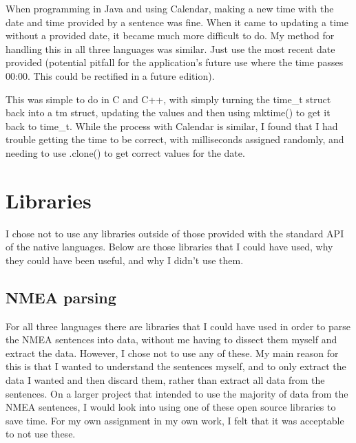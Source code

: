 \documentclass{article}
\begin{document}
When programming in Java and using Calendar, making a new time with the date and time provided by a sentence was fine. When it came to updating a time without a provided date, it became much more difficult to do. My method for handling this in all three languages was similar. Just use the most recent date provided (potential pitfall for the application's future use where the time passes 00:00. This could be rectified in a future edition). 

This was simple to do in C and C++, with simply turning the time\_t struct back into a tm struct, updating the values and then using mktime() to get it back to time\_t. While the process with Calendar is similar, I found that I had trouble getting the time to be correct, with milliseconds assigned randomly, and needing to use .clone() to get correct values for the date.








\section{Libraries}

I chose not to use any libraries outside of those provided with the standard API of the native languages. Below are those libraries that I could have used, why they could have been useful, and why I didn't use them.

\subsection{NMEA parsing}
For all three languages there are libraries that I could have used in order to parse the NMEA sentences into data, without me having to dissect them myself and extract the data\cite{nmeajava}\cite{nmeacplusplus}. However, I chose not to use any of these. My main reason for this is that I wanted to understand the sentences myself, and to only extract the data I wanted and then discard them, rather than extract all data from the sentences. On a larger project that intended to use the majority of data from the NMEA sentences, I would look into using one of these open source libraries to save time. For my own assignment in my own work, I felt that it was acceptable to not use these.
\end{document}
